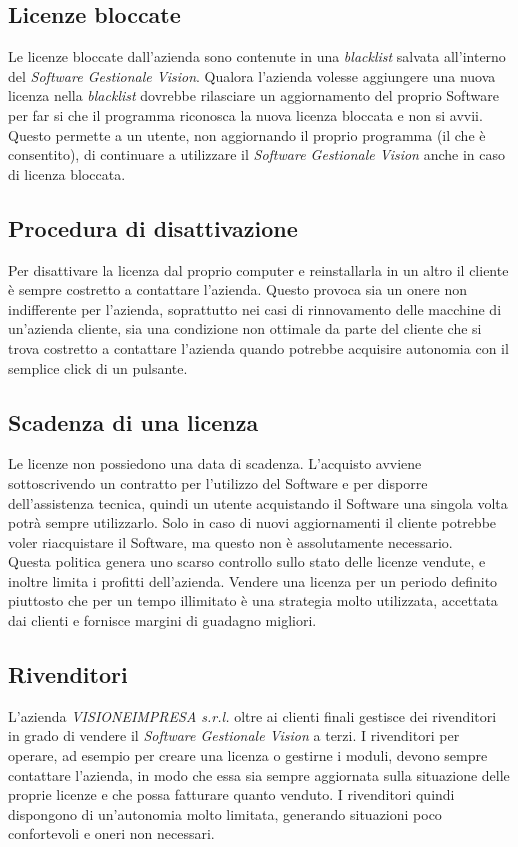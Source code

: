 \subsection{Licenze bloccate} 

Le licenze bloccate dall'azienda sono contenute in una \textit{blacklist} salvata all’interno del \textit{Software Gestionale Vision}. Qualora l'azienda volesse aggiungere una nuova licenza nella \textit{blacklist} dovrebbe rilasciare un aggiornamento del proprio Software per far si che il programma riconosca la nuova licenza bloccata e non si avvii.
\\Questo permette a un utente, non aggiornando il proprio programma (il che è consentito), di continuare a utilizzare il \textit{Software Gestionale Vision} anche in caso di licenza bloccata. 

\subsection{Procedura di disattivazione} 
Per disattivare la licenza dal proprio computer e reinstallarla in un altro il cliente è sempre costretto a contattare l'azienda. Questo provoca sia un onere non indifferente per l'azienda, soprattutto nei casi di rinnovamento delle macchine di un'azienda cliente, sia una condizione non ottimale da parte del cliente che si trova costretto a contattare l'azienda quando potrebbe acquisire autonomia con il semplice click di un pulsante.

\subsection{Scadenza di una licenza} 
Le licenze non possiedono una data di scadenza. L'acquisto avviene sottoscrivendo un contratto per l'utilizzo del Software e per disporre dell'assistenza tecnica, quindi un utente acquistando il Software una singola volta potrà sempre utilizzarlo. Solo in caso di nuovi aggiornamenti il cliente potrebbe voler riacquistare il Software, ma questo non è assolutamente necessario. 
\\Questa politica genera uno scarso controllo sullo stato delle licenze vendute, e inoltre limita i profitti dell'azienda. Vendere una licenza per un periodo definito piuttosto che per un tempo illimitato è una strategia molto utilizzata, accettata dai clienti e fornisce margini di guadagno migliori.

\subsection{Rivenditori} 
L'azienda \textit{VISIONEIMPRESA s.r.l.} oltre ai clienti finali gestisce dei rivenditori in grado di vendere il \textit{Software Gestionale Vision} a terzi. 
I rivenditori per operare, ad esempio per creare una licenza o gestirne i moduli, devono sempre contattare l'azienda, in modo che essa sia sempre aggiornata sulla situazione delle proprie licenze e che possa fatturare quanto venduto. I rivenditori quindi dispongono di un'autonomia molto limitata, generando situazioni poco confortevoli e oneri non necessari.

